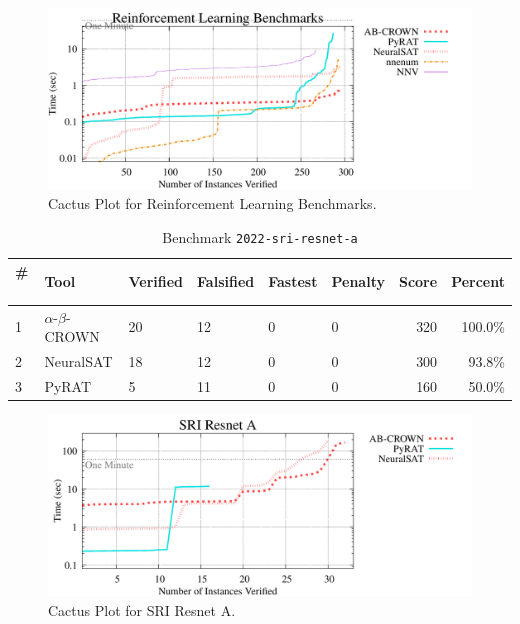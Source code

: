 \begin{figure}[h]
\centerline{\includegraphics[width=\textwidth]{cactus/2022_rl_benchmarks.pdf}}
\caption{Cactus Plot for Reinforcement Learning Benchmarks.}
\label{fig:quantPic}
\end{figure}



\begin{table}[h]
\begin{center}
\caption{Benchmark \texttt{2022-sri-resnet-a}} \label{tab:cat_{cat}}
{\setlength{\tabcolsep}{2pt}
\begin{tabular}[h]{@{}llllllrr@{}}
\toprule
\textbf{\# ~} & \textbf{Tool} & \textbf{Verified} & \textbf{Falsified} & \textbf{Fastest} & \textbf{Penalty} & \textbf{Score} & \textbf{Percent}\\
\midrule
1 & $\alpha$-$\beta$-CROWN & 20 & 12 & 0 & 0 & 320 & 100.0\% \\
2 & NeuralSAT & 18 & 12 & 0 & 0 & 300 & 93.8\% \\
3 & PyRAT & 5 & 11 & 0 & 0 & 160 & 50.0\% \\
\bottomrule
\end{tabular}
}
\end{center}
\end{table}



\begin{figure}[h]
\centerline{\includegraphics[width=\textwidth]{cactus/2022_sri_resnet_a.pdf}}
\caption{Cactus Plot for SRI Resnet A.}
\label{fig:quantPic}
\end{figure}


